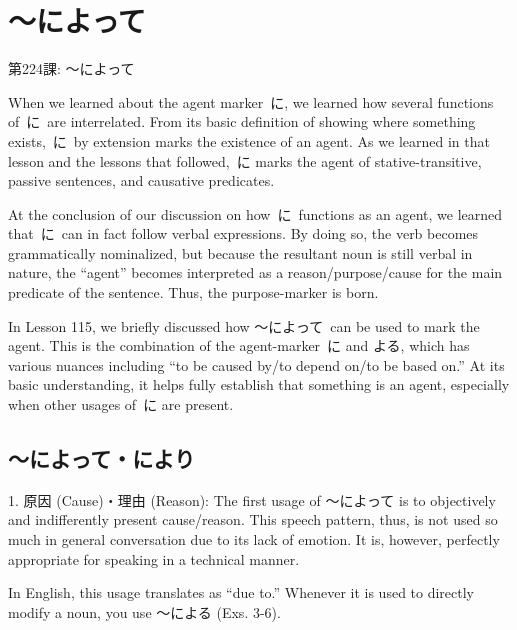     
\chapter{～によって}

\begin{center}
\begin{Large}
第224課: ～によって 
\end{Large}
\end{center}
 
\par{ When we learned about the agent marker に, we learned how several functions of に are interrelated. From its basic definition of showing where something exists, に by extension marks the existence of an agent. As we learned in that lesson and the lessons that followed, に marks the agent of stative-transitive, passive sentences, and causative predicates. }

\par{ At the conclusion of our discussion on how に functions as an agent, we learned that に can in fact follow verbal expressions. By doing so, the verb becomes grammatically nominalized, but because the resultant noun is still verbal in nature, the “agent” becomes interpreted as a reason\slash purpose\slash cause for the main predicate of the sentence. Thus, the purpose-marker is born. }

\par{ In Lesson 115, we briefly discussed how ～によって can be used to mark the agent. This is the combination of the agent-marker に and よる, which has various nuances including “to be caused by\slash to depend on\slash to be based on.” At its basic understanding, it helps fully establish that something is an agent, especially when other usages of に are present. }
      
\section{～によって・により}
 
\par{1. 原因 (Cause)・理由 (Reason): The first usage of ～によって is to objectively and indifferently present cause\slash reason. This speech pattern, thus, is not used so much in general conversation due to its lack of emotion. It is, however, perfectly appropriate for speaking in a technical manner. }

\par{ In English, this usage translates as “due to.” Whenever it is used to directly modify a noun, you use ～による (Exs. 3-6). }

